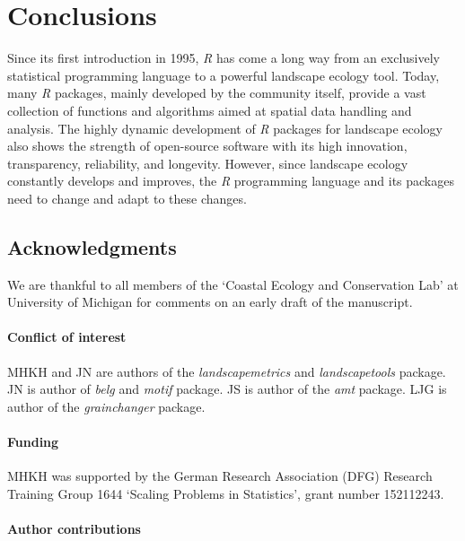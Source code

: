 \documentclass[smallextended]{svjour3}       %
\begin{document}
\hypertarget{conclusions}{%
\section{Conclusions}\label{conclusions}}

Since its first introduction in 1995, \emph{R} has come a long way from an exclusively statistical programming language to a powerful landscape ecology tool.
Today, many \emph{R} packages, mainly developed by the community itself, provide a vast collection of functions and algorithms aimed at spatial data handling and analysis.
The highly dynamic development of \emph{R} packages for landscape ecology also shows the strength of open-source software with its high innovation, transparency, reliability, and longevity.
However, since landscape ecology constantly develops and improves, the \emph{R} programming language and its packages need to change and adapt to these changes.

\hypertarget{acknowledgments}{%
\subsection{Acknowledgments}\label{acknowledgments}}

We are thankful to all members of the `Coastal Ecology and Conservation Lab' at University of Michigan for comments on an early draft of the manuscript.

\hypertarget{conflict-of-interest}{%
\paragraph{Conflict of interest}\label{conflict-of-interest}}

MHKH and JN are authors of the \emph{landscapemetrics} and \emph{landscapetools} package.
JN is author of \emph{belg} and \emph{motif} package. JS is author of the \emph{amt} package. LJG is author of the \emph{grainchanger} package.

\hypertarget{funding}{%
\paragraph{Funding}\label{funding}}

MHKH was supported by the German Research Association (DFG) Research Training Group 1644 `Scaling Problems in Statistics', grant number 152112243.

\hypertarget{author-contributions}{%
\paragraph{Author contributions}\label{author-contributions}}
\end{document}
